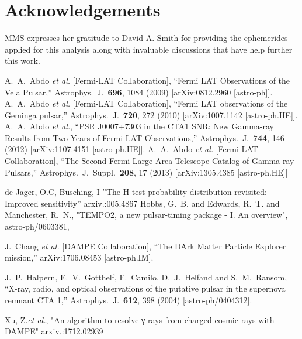 \documentclass{PoS}
\begin{document}
\section{Acknowledgements}
MMS expresses her gratitude to David A. Smith for providing the ephemerides applied for this analysis along with invaluable discussions that have help further this work.



\begin{thebibliography}{99}

  A.~A.~Abdo {\it et al.} [Fermi-LAT Collaboration],
  ``Fermi LAT Observations of the Vela Pulsar,''
  Astrophys.\ J.\  {\bf 696}, 1084 (2009)
  [arXiv:0812.2960 [astro-ph]].
  A.~A.~Abdo {\it et al.} [Fermi-LAT Collaboration],
  ``Fermi LAT observations of the Geminga pulsar,''
  Astrophys.\ J.\  {\bf 720}, 272 (2010)
  [arXiv:1007.1142 [astro-ph.HE]].
  A.~A.~Abdo {\it et al.},
  ``PSR J0007+7303 in the CTA1 SNR: New Gamma-ray Results from Two Years of Fermi-LAT Observations,''
  Astrophys.\ J.\  {\bf 744}, 146 (2012)
  [arXiv:1107.4151 [astro-ph.HE]].
  A.~A.~Abdo {\it et al.} [Fermi-LAT Collaboration],
  ``The Second Fermi Large Area Telescope Catalog of Gamma-ray Pulsars,''
  Astrophys.\ J.\ Suppl.\  {\bf 208}, 17 (2013)
  [arXiv:1305.4385 [astro-ph.HE]]

de Jager, O.C, Büsching, I
''The H-test probability distribution revisited: Improved sensitivity''
    arxiv.:005.4867
{{Hobbs}, G.~B. and {Edwards}, R.~T. and {Manchester}, R.~N.},
"{TEMPO2, a new pulsar-timing package - I. An overview}",
{astro-ph/0603381},

  J.~Chang {\it et al.} [DAMPE Collaboration],
  ``The DArk Matter Particle Explorer mission,''
  arXiv:1706.08453 [astro-ph.IM].

J.~P.~Halpern, E.~V.~Gotthelf, F.~Camilo, D.~J.~Helfand and S.~M.~Ransom,
 ``X-ray, radio, and optical observations of the putative pulsar in the supernova remnant CTA 1,''
  Astrophys.\ J.\  {\bf 612}, 398 (2004)
  [astro-ph/0404312].

Xu, Z.{\it et al.},
"An algorithm to resolve γ-rays from charged cosmic rays with DAMPE"
arxiv.:1712.02939


\end{thebibliography}
\end{document}
